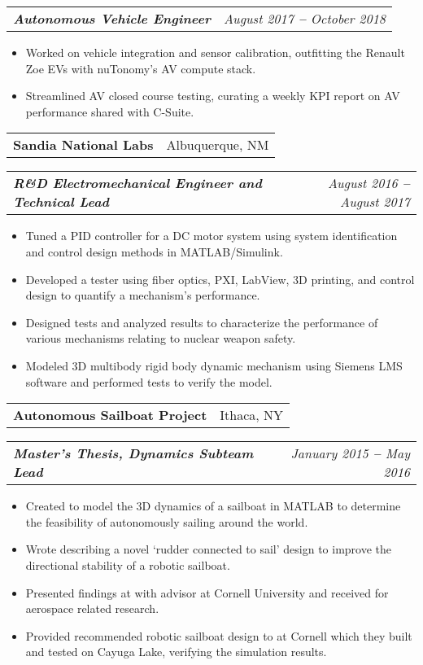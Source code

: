 \documentclass[letterpaper,11pt]{article}
\makeatletter
\def\vspaceAfterBullets{3pt} %
\def\bulletIndent{15pt} %
\newcommand{\bulletItem}[1]{
  \item\small{
    {#1}
  }
}
\newcommand{\companyNameAndLocationHeading}[2]{
  \item 
    \begin{tabular*}{1.0\textwidth}[b]{l@{\extracolsep{\fill}}r}
      \textbf{#1} & #2
    \end{tabular*}
}
\newcommand{\titleAndDateHeading}[2]{
    \item
    \begin{tabular*}{1.0\textwidth}[b]{l@{\extracolsep{\fill}}r}
      \textit{\textbf{\small#1}} & \textit{\small #2}
    \end{tabular*}
}
\newcommand{\outerBulletListStart}{\begin{itemize}[leftmargin=\bulletIndent]}
\newcommand{\outerBulletListEnd}{\end{itemize}\vspace{\vspaceAfterBullets}}
\newcommand{\bref}[2]{\href{#1}{\color{blue}{#2}}}
\makeatother
\begin{document}
\titleAndDateHeading
{Autonomous Vehicle Engineer}{August 2017 \textbf{--} October 2018}
\outerBulletListStart
\bulletItem{Worked on vehicle integration and sensor calibration, outfitting the Renault Zoe EVs with nuTonomy’s AV compute stack.}
\bulletItem{Streamlined AV closed course testing, curating a weekly KPI report on AV performance shared with C-Suite.}
\outerBulletListEnd

\companyNameAndLocationHeading
{Sandia National Labs}{Albuquerque, NM}
\titleAndDateHeading
{R\&D Electromechanical Engineer and Technical Lead}{August 2016 \textbf{--} August 2017}
\outerBulletListStart
\bulletItem{Tuned a PID controller for a DC motor system using system identification and control design methods in MATLAB/Simulink.}
\bulletItem{Developed a tester using fiber optics, PXI, LabView, 3D printing, and control design to quantify a mechanism’s performance.}
\bulletItem{Designed tests and analyzed results to characterize the performance of various mechanisms relating to nuclear weapon safety.}
\bulletItem{Modeled 3D multibody rigid body dynamic mechanism using Siemens LMS software and performed tests to verify the model.}
\outerBulletListEnd

\companyNameAndLocationHeading
{Autonomous Sailboat Project}{Ithaca, NY}
\titleAndDateHeading
{Master’s Thesis, Dynamics Subteam Lead}{January 2015 \textbf{--} May 2016}
\outerBulletListStart
\bulletItem{Created \bref{https://github.com/jam643/SailboatSim3D/tree/master}{a simulation framework} to model the 3D dynamics of a sailboat in MATLAB to determine the feasibility of autonomously sailing around the world.}
\bulletItem{Wrote \bref{https://bpb-us-w2.wpmucdn.com/sites.coecis.cornell.edu/dist/5/91/files/2017/06/Semester-Report-Spring-2016-Jesse-Miller-1e485cb.pdf}{a thesis paper} describing a novel ‘rudder connected to sail’ design to improve the directional stability of a robotic sailboat.}
\bulletItem{Presented findings at \bref{https://robotics.cornell.edu/2019/08/14/a-directionally-self-stable-robotic-sail-boat-concept-and-simulations/}{a robotics seminar} with advisor \bref{http://ruina.tam.cornell.edu/}{Andy Ruina} at Cornell University and received \bref{https://www.mae.cornell.edu/news/sibley-school-mechanical-aerospace-engineering-student-awards-0}{the Kelly Prize} for aerospace related research.}
\bulletItem{Provided recommended robotic sailboat design to \bref{https://cusail.com/}{CUSail project team} at Cornell which they built and tested on Cayuga Lake, verifying the simulation results.}
\outerBulletListEnd
\end{document}
